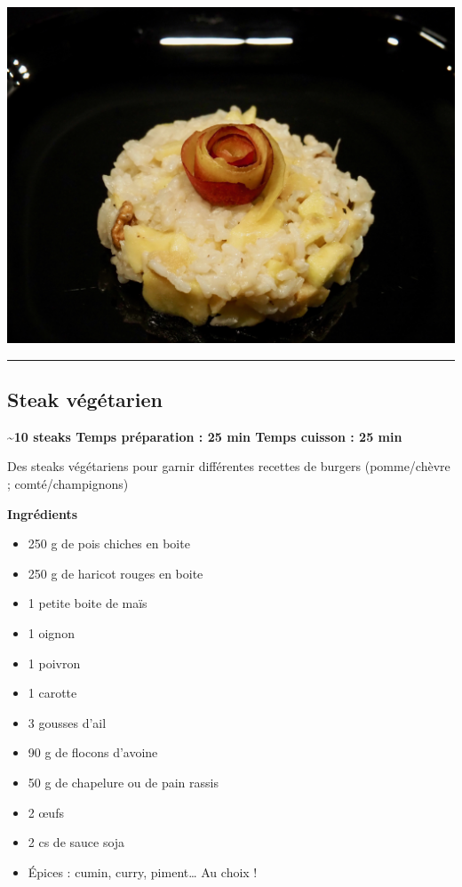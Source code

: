 \documentclass[]{book}
\providecommand{\tightlist}{%
  \setlength{\itemsep}{0pt}\setlength{\parskip}{0pt}}
\begin{document}
\begin{center}\includegraphics[width=0.9\linewidth]{photos/risotto-gorgonzola} \end{center}

\begin{center}\rule{0.5\linewidth}{0.5pt}\end{center}

\hypertarget{steak-vuxe9guxe9tarien}{%
\subsection*{\texorpdfstring{{Steak végétarien}}{Steak végétarien}}\label{steak-vuxe9guxe9tarien}}

\begin{salebox}
\textbf{\textasciitilde{}10 steaks \textbar{} Temps préparation : 25 min
\textbar{} Temps cuisson : 25 min}

Des steaks végétariens pour garnir différentes recettes de burgers
(pomme/chèvre ; comté/champignons)
\end{salebox}

\textbf{Ingrédients}

\begin{itemize}
\tightlist
\item
  250 g de pois chiches en boite
\item
  250 g de haricot rouges en boite
\item
  1 petite boite de maïs
\item
  1 oignon
\item
  1 poivron
\item
  1 carotte
\item
  3 gousses d'ail
\item
  90 g de flocons d'avoine
\item
  50 g de chapelure ou de pain rassis
\item
  2 œufs
\item
  2 cs de sauce soja
\item
  Épices : cumin, curry, piment\ldots{} Au choix !
\end{itemize}
\end{document}
